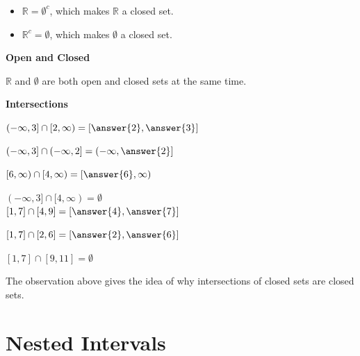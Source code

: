 \documentclass{ximera}
\begin{document}
\begin{itemize}
\item $\mathbb{R} = \emptyset^c$, which makes $\mathbb{R}$ a closed set.
\item $\mathbb{R}^c = \emptyset$, which makes $\emptyset$ a closed set.
\end{itemize}





\begin{fact} \textbf{\textcolor{red!75!green!50}{Open and Closed}}  

$\mathbb{R}$ and $\emptyset$ are both open and closed sets at the same time.


\end{fact}






\begin{observation} \textbf{\textcolor{-red!75}{Intersections}} 

$(-\infty, 3] \cap  [2, \infty) = \left[\answer{2}, \answer{3}\right]$

$(-\infty, 3] \cap  (-\infty, 2] = \left(-\infty, \answer{2}\right]$

$[6, \infty)  \cap  [4, \infty) = \left[\answer{6}, \infty\right)$

$(-\infty, 3] \cap  [4, \infty) = \emptyset$ \\






$[1, 7] \cap  [4, 9] = \left[\answer{4}, \answer{7}\right]$

$[1, 7] \cap  [2, 6] = \left[\answer{2}, \answer{6}\right]$

$[1, 7] \cap  [9, 11] = \emptyset$


\end{observation}


The observation above gives the idea of why intersections of closed sets are closed sets.
















\section*{Nested Intervals}
\end{document}
